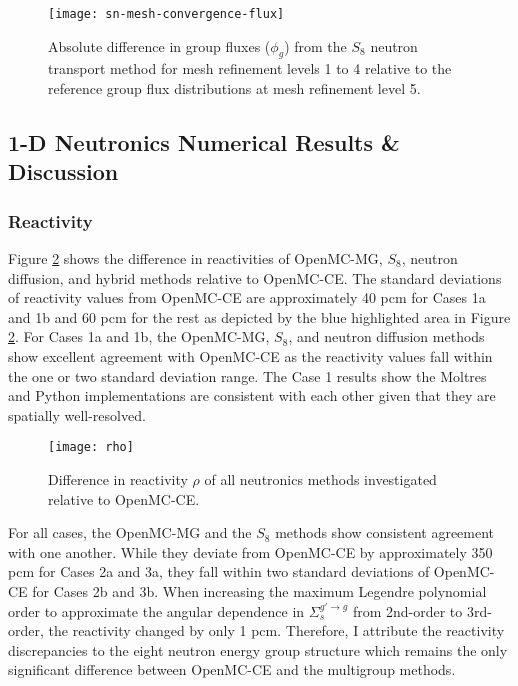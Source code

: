 \begin{figure}[htb!]
  \centering
  \texttt{[image: sn-mesh-convergence-flux]}
  \caption{Absolute difference in group fluxes ($\phi_g$) from the $S_8$ neutron transport method
  for mesh refinement levels 1 to 4 relative to the reference group flux distributions at mesh
  refinement level 5.}
  \label{fig:sn-mesh-flux}
\end{figure}

\FloatBarrier

\subsection{1-D Neutronics Numerical Results \& Discussion}

\subsubsection{Reactivity}

Figure \ref{fig:1d-rho} shows the difference in reactivities of OpenMC-MG, $S_8$,
neutron diffusion, and hybrid methods relative to OpenMC-CE. The standard deviations of
reactivity values from OpenMC-CE are approximately 40 pcm for Cases 1a and 1b and 60 pcm for the
rest as depicted by the blue highlighted area in Figure \ref{fig:1d-rho}. For Cases 1a and 1b, the
OpenMC-MG, $S_8$, and neutron diffusion methods show excellent agreement with OpenMC-CE as the
reactivity values fall within the one or two standard deviation range. The Case 1 results show
the Moltres and Python implementations are consistent with each other given that they are spatially
well-resolved.

\begin{figure}[htb!]
  \centering
  \texttt{[image: rho]}
  \caption{Difference in reactivity $\rho$ of all neutronics methods investigated relative
  to OpenMC-CE.}
  \label{fig:1d-rho}
\end{figure}

For all cases, the OpenMC-MG and the $S_8$ methods show consistent agreement with one another. 
While they deviate from OpenMC-CE by approximately 350 pcm for Cases 2a and 3a, they fall within
two standard deviations of OpenMC-CE for Cases 2b and 3b. When increasing the maximum Legendre
polynomial order to approximate the angular dependence in $\Sigma_s^{g'\rightarrow g}$ from
2nd-order to 3rd-order, the reactivity changed by only 1 pcm. Therefore, I attribute the reactivity
discrepancies to the eight neutron energy group structure which remains the
only significant difference between OpenMC-CE and the multigroup methods.

